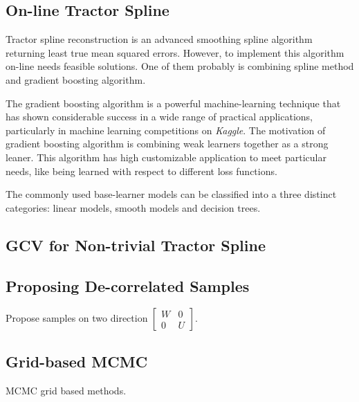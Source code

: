 

\subsection*{On-line Tractor Spline}

Tractor spline reconstruction is an advanced smoothing spline algorithm returning least true mean squared errors. However, to implement this algorithm on-line needs feasible solutions. One of them probably is combining spline method and gradient boosting algorithm. 

The gradient boosting algorithm is a powerful machine-learning technique that has shown considerable success in a wide range of practical applications, particularly in machine learning competitions on \textit{Kaggle}. The motivation of gradient boosting algorithm is combining weak learners together as a strong leaner. This algorithm has high customizable application to meet particular needs, like being learned with respect to different loss functions. 

The commonly used base-learner models can be classified into a three distinct categories: linear models, smooth models and decision trees. 


\subsection*{GCV for Non-trivial Tractor Spline}


\subsection*{Proposing De-correlated Samples}

Propose samples on two direction $\begin{bmatrix}
W & 0 \\ 0 & U
\end{bmatrix}$.


\subsection*{Grid-based MCMC}

MCMC grid based methods. 


